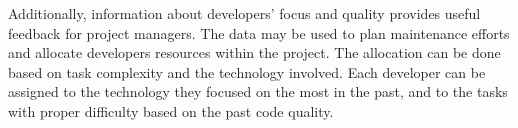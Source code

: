 Additionally, information about developers’ focus and quality provides useful feedback for project managers. The data may be used to plan maintenance efforts and allocate developers resources within the project. The allocation can be done based on task complexity and the technology involved. Each developer can be assigned to the technology they focused on the most in the past, and to the tasks with proper difficulty based on the past code quality.\par

